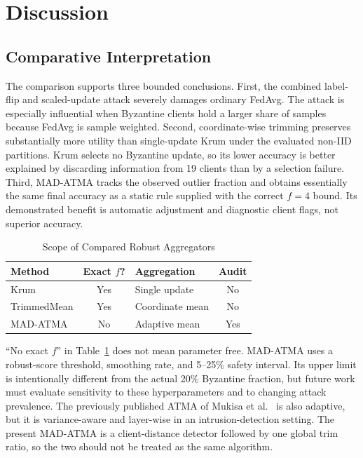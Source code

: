 \documentclass[10pt,letterpaper]{article}
\begin{document}
\section{Discussion}

\subsection{Comparative Interpretation}

The comparison supports three bounded conclusions. First, the combined
label-flip and scaled-update attack severely damages ordinary FedAvg. The
attack is especially influential when Byzantine clients hold a larger share of
samples because FedAvg is sample weighted. Second, coordinate-wise trimming
preserves substantially more utility than single-update Krum under the
evaluated non-IID partitions. Krum selects no Byzantine update, so its lower
accuracy is better explained by discarding information from 19 clients than by
a selection failure. Third, MAD-ATMA tracks the observed outlier fraction and
obtains essentially the same final accuracy as a static rule supplied with the
correct $f=4$ bound. Its demonstrated benefit is automatic adjustment and
diagnostic client flags, not superior accuracy.

\begin{table}[t]
\caption{Scope of Compared Robust Aggregators}
\label{tab:method_scope}
\centering
\scriptsize
\begin{tabular}{lclc}
\toprule
Method & Exact $f$? & Aggregation & Audit\\
\midrule
Krum & Yes & Single update & No\\
TrimmedMean & Yes & Coordinate mean & No\\
MAD-ATMA & No & Adaptive mean & Yes\\
\bottomrule
\end{tabular}
\end{table}

``No exact $f$'' in Table~\ref{tab:method_scope} does not mean parameter free.
MAD-ATMA uses a robust-score threshold, smoothing rate, and 5--25\% safety
interval. Its upper limit is intentionally different from the actual 20\%
Byzantine fraction, but future work must evaluate sensitivity to these
hyperparameters and to changing attack prevalence. The previously published
ATMA of Mukisa et al.~\cite{mukisa2025} is also adaptive, but it is
variance-aware and layer-wise in an intrusion-detection setting. The present
MAD-ATMA is a client-distance detector followed by one global trim ratio, so
the two should not be treated as the same algorithm.
\end{document}
